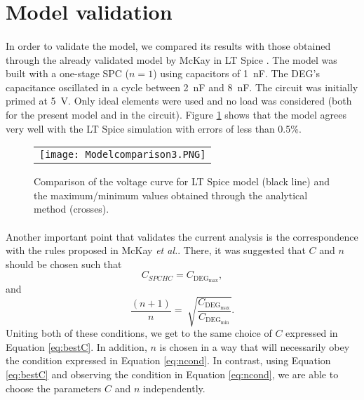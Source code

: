 \section{Model validation}

\paragraph{} In order to validate the model, we compared its results with those obtained through the already validated model by McKay in LT Spice \cite{Thesis}. The model was built with a one-stage SPC ($n=1$) using capacitors of \SI{1}{\nano\farad}. The DEG's capacitance oscillated in a cycle between \SI{2}{\nano\farad} and \SI{8}{\nano\farad}. The circuit was initially primed at \SI{5}{\volt}. Only ideal elements were used and no load was considered (both for the present model and in the circuit). Figure \ref{fig:valid} shows that the model agrees very well with the LT Spice simulation with errors of less than 0.5\%.

\begin{figure}[ht]
\begin{center}
\begin{tabular}{c}
\texttt{[image: Modelcomparison3.PNG]}\\
\end{tabular}
\end{center}
\caption 
{ \label{fig:valid}
Comparison of the voltage curve for LT Spice model (black line) and the maximum/minimum values obtained through the analytical method (crosses).} 
\end{figure}

\paragraph{} Another important point that validates the current analysis is the correspondence with the rules proposed in McKay \textit{et al.}\cite{SPCdesign}. There, it was suggested that $C$ and $n$ should be chosen such that
\begin{equation}
C_{SPC{HC}} = C_{\text{DEG}_\text{max}},
\end{equation}
and
\begin{equation}
\frac{(n+1)}{n} = \sqrt[]{\frac{C_{\text{DEG}_\text{max}}}{C_{\text{DEG}_\text{min}}}}.
\end{equation}
Uniting both of these conditions, we get to the same choice of $C$  expressed in Equation \ref{eq:bestC}. In addition, $n$ is chosen in a way that will necessarily obey the condition expressed in Equation \ref{eq:ncond}. In contrast, using Equation  \ref{eq:bestC} and observing the condition in Equation \ref{eq:ncond},  we are able to choose the parameters $C$ and $n$ independently.


